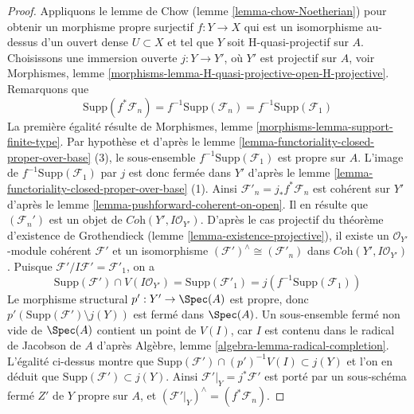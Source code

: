 \begin{proof}
\medskip\noindent
Appliquons le lemme de Chow (lemme \ref{lemma-chow-Noetherian}) pour obtenir un
morphisme propre surjectif $f : Y \to X$ qui est un isomorphisme
au-dessus d'un ouvert dense $U \subset X$ et tel que $Y$ soit H-quasi-projectif
sur $A$. Choisissons une immersion ouverte $j : Y \to Y'$, où
$Y'$ est projectif sur $A$, voir
Morphismes, lemme \ref{morphisms-lemma-H-quasi-projective-open-H-projective}.
Remarquons que
$$
\text{Supp}(f^*\mathcal{F}_n) = f^{-1}\text{Supp}(\mathcal{F}_n) =
f^{-1}\text{Supp}(\mathcal{F}_1)
$$
La première égalité résulte de
Morphismes, lemme \ref{morphisms-lemma-support-finite-type}.
Par hypothèse et d'après le
lemme \ref{lemma-functoriality-closed-proper-over-base} (3),
le sous-ensemble $f^{-1}\text{Supp}(\mathcal{F}_1)$ est propre sur $A$.
L'image de $f^{-1}\text{Supp}(\mathcal{F}_1)$
par $j$ est donc fermée dans $Y'$ d'après le
lemme \ref{lemma-functoriality-closed-proper-over-base} (1).
Ainsi $\mathcal{F}'_n = j_*f^*\mathcal{F}_n$ est cohérent sur
$Y'$ d'après le lemme \ref{lemma-pushforward-coherent-on-open}.
Il en résulte que $(\mathcal{F}_n')$
est un objet de $\textit{Coh}(Y', I\mathcal{O}_{Y'})$.
D'après le cas projectif du théorème d'existence de Grothendieck
(lemme \ref{lemma-existence-projective}),
il existe un $\mathcal{O}_{Y'}$-module cohérent
$\mathcal{F}'$ et un isomorphisme
$(\mathcal{F}')^\wedge \cong (\mathcal{F}'_n)$ dans
$\textit{Coh}(Y', I\mathcal{O}_{Y'})$.
Puisque $\mathcal{F}'/I\mathcal{F}' = \mathcal{F}'_1$, on a
$$
\text{Supp}(\mathcal{F}') \cap V(I\mathcal{O}_{Y'}) =
\text{Supp}(\mathcal{F}'_1) = j(f^{-1}\text{Supp}(\mathcal{F}_1))
$$
Le morphisme structural $p' : Y' \to \Spec(A)$ est propre, donc
$p'(\text{Supp}(\mathcal{F}') \setminus j(Y))$
est fermé dans $\Spec(A)$. Un sous-ensemble fermé non vide de $\Spec(A)$
contient un point de $V(I)$, car $I$ est contenu dans le radical de Jacobson
de $A$ d'après Algèbre, lemme \ref{algebra-lemma-radical-completion}.
L'égalité ci-dessus montre que
$\text{Supp}(\mathcal{F}') \cap (p')^{-1}V(I) \subset j(Y)$
et l'on en déduit que $\text{Supp}(\mathcal{F}') \subset j(Y)$.
Ainsi $\mathcal{F}'|_Y = j^*\mathcal{F}'$
est porté par un sous-schéma fermé $Z'$ de $Y$ propre sur $A$,
et $(\mathcal{F}'|_Y)^\wedge = (f^*\mathcal{F}_n)$.


\end{proof}
